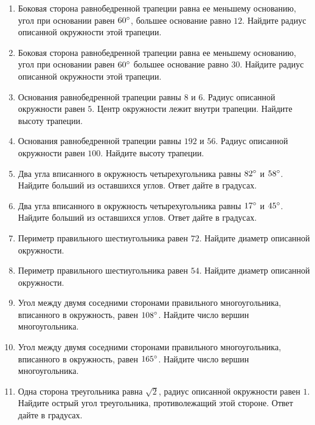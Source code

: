 \documentclass[12pt, a4paper]{article}
\begin{document}
\begin{enumerate}
		\item Боковая сторона равнобедренной трапеции равна ее меньшему основанию, угол при основании равен \( 60\degree\), большее основание равно \( 12 \). Найдите радиус описанной окружности этой трапеции.
		\item Боковая сторона равнобедренной трапеции равна ее меньшему основанию, угол при основании равен \( 60  \degree\) большее основание равно \( 30 \). Найдите радиус описанной окружности этой трапеции.
		\item Основания равнобедренной трапеции равны \( 8  \) и \( 6 \). Радиус описанной окружности равен \( 5 \). Центр окружности лежит внутри трапеции. Найдите высоту трапеции.
		\item Основания равнобедренной трапеции равны \( 192  \) и \( 56 \). Радиус описанной окружности равен \( 100 \). Найдите высоту трапеции.
		\item Два угла вписанного в окружность четырехугольника равны \( 82\degree \) и \( 58\degree \). Найдите больший из оставшихся углов. Ответ дайте в градусах.
		\item Два угла вписанного в окружность четырехугольника равны \( 17\degree \) и \( 45  \degree\). Найдите больший из оставшихся углов. Ответ дайте в градусах.
		\item Периметр правильного шестиугольника равен \( 72 \). Найдите диаметр описанной окружности.
		\item Периметр правильного шестиугольника равен \( 54 \). Найдите диаметр описанной окружности.
		\item Угол между двумя соседними сторонами правильного многоугольника, вписанного в окружность, равен \( 108\degree \). Найдите число вершин многоугольника.
		\item Угол между двумя соседними сторонами правильного многоугольника, вписанного в окружность, равен \( 165\degree \). Найдите число вершин многоугольника.
		\item Одна сторона треугольника равна \( \sqrt{2} \), радиус описанной окружности равен \( 1 \). Найдите острый угол треугольника, противолежащий этой стороне. Ответ дайте в градусах.
	\end{enumerate}
	
\end{document}
